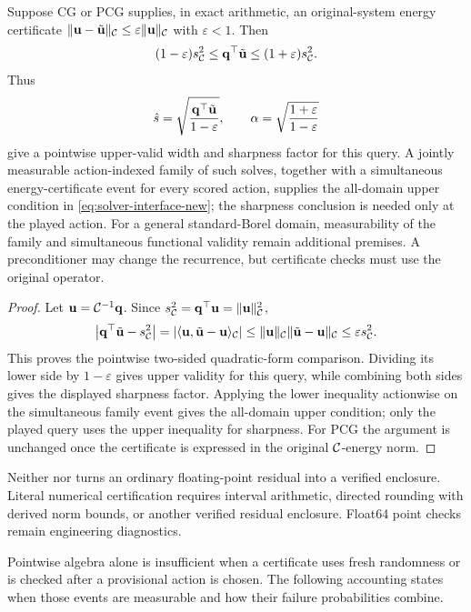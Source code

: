 \begin{corollary}
\label{cor:cg-interface-new}
Suppose CG or PCG supplies, in exact arithmetic, an original-system energy
certificate
$\|\mathbf{u}-\tilde{\mathbf{u}}\|_{\mathcal{C}}\le\varepsilon\|\mathbf{u}\|_{\mathcal{C}}$ with
$\varepsilon<1$.  Then
\[
 (1-\varepsilon)s_{\mathcal{C}}^2
 \le\mathbf{q}^\top\tilde{\mathbf{u}}
 \le(1+\varepsilon)s_{\mathcal{C}}^2.
\]
Thus
\[
 \hat s=\sqrt{\frac{\mathbf{q}^\top\tilde{\mathbf{u}}}{1-\varepsilon}},
 \qquad
 \alpha=\sqrt{\frac{1+\varepsilon}{1-\varepsilon}}
\]
give a pointwise upper-valid width and sharpness factor for this query.  A
jointly measurable action-indexed family of such solves, together with a
simultaneous energy-certificate event for every scored action, supplies the
all-domain upper condition in \eqref{eq:solver-interface-new}; the sharpness
conclusion is needed only at the played action.  For a general standard-Borel
domain, measurability of the family and simultaneous functional validity remain
additional premises.  A preconditioner may change the recurrence, but
certificate checks must use the original operator.
\end{corollary}
\begin{proof}
Let $\mathbf{u}=\mathcal{C}^{-1}\mathbf{q}$.  Since
$s_{\mathcal{C}}^2=\mathbf{q}^\top\mathbf{u}=\|\mathbf{u}\|_{\mathcal{C}}^2$,
\[
 \left|\mathbf{q}^\top\tilde{\mathbf{u}}-s_{\mathcal{C}}^2\right|
 =\left|\langle\mathbf{u},\tilde{\mathbf{u}}-\mathbf{u}\rangle_{\mathcal{C}}\right|
 \le\|\mathbf{u}\|_{\mathcal{C}}\|\tilde{\mathbf{u}}-\mathbf{u}\|_{\mathcal{C}}
 \le\varepsilon s_{\mathcal{C}}^2.
\]
This proves the pointwise two-sided quadratic-form comparison.  Dividing its
lower side by $1-\varepsilon$ gives upper validity for this query, while
combining both sides gives the displayed sharpness factor.  Applying the lower
inequality actionwise on the simultaneous family event gives the all-domain
upper condition; only the played query uses the upper inequality for
sharpness.  For PCG the argument is unchanged once the certificate is expressed
in the original $\mathcal{C}$-energy norm.
\end{proof}

Neither  nor
 turns an ordinary floating-point residual into a
verified enclosure.  Literal numerical certification requires interval
arithmetic, directed rounding with derived norm bounds, or another verified
residual enclosure.  Float64 point checks remain engineering diagnostics.

Pointwise algebra alone is insufficient when a certificate uses fresh
randomness or is checked after a provisional action is chosen.  The following
accounting states when those events are measurable and how their failure
probabilities combine.

